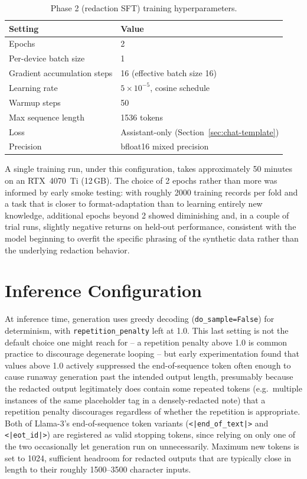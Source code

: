 \documentclass[12pt,a4paper]{report}
\begin{document}
\begin{table}[htbp]
\centering
\caption{Phase 2 (redaction SFT) training hyperparameters.}
\label{tab:hyperparams}
\begin{tabular}{ll}
\toprule
Setting & Value \\
\midrule
Epochs & 2 \\
Per-device batch size & 1 \\
Gradient accumulation steps & 16 (effective batch size 16) \\
Learning rate & $5 \times 10^{-5}$, cosine schedule \\
Warmup steps & 50 \\
Max sequence length & 1536 tokens \\
Loss & Assistant-only (Section~\ref{sec:chat-template}) \\
Precision & bfloat16 mixed precision \\
\bottomrule
\end{tabular}
\end{table}

A single training run, under this configuration, takes approximately 50 minutes on an RTX~4070~Ti (12\,GB). The choice of 2 epochs rather than more was informed by early smoke testing: with roughly 2000 training records per fold and a task that is closer to format-adaptation than to learning entirely new knowledge, additional epochs beyond 2 showed diminishing and, in a couple of trial runs, slightly negative returns on held-out performance, consistent with the model beginning to overfit the specific phrasing of the synthetic data rather than the underlying redaction behavior.

\section{Inference Configuration}

At inference time, generation uses greedy decoding (\texttt{do\_sample=False}) for determinism, with \texttt{repetition\_penalty} left at 1.0. This last setting is not the default choice one might reach for -- a repetition penalty above 1.0 is common practice to discourage degenerate looping -- but early experimentation found that values above 1.0 actively suppressed the end-of-sequence token often enough to cause runaway generation past the intended output length, presumably because the redacted output legitimately does contain some repeated tokens (e.g.\ multiple instances of the same placeholder tag in a densely-redacted note) that a repetition penalty discourages regardless of whether the repetition is appropriate. Both of Llama-3's end-of-sequence token variants (\texttt{<|end\_of\_text|>} and \texttt{<|eot\_id|>}) are registered as valid stopping tokens, since relying on only one of the two occasionally let generation run on unnecessarily. Maximum new tokens is set to 1024, sufficient headroom for redacted outputs that are typically close in length to their roughly 1500--3500 character inputs.
\end{document}
